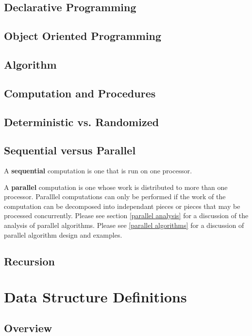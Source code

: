 \documentclass[12pt, letterpaper]{book}
\begin{document}
\section{Declarative Programming}

\section{Object Oriented Programming}

\section{Algorithm}

\section{Computation and Procedures}

\section{Deterministic vs. Randomized}

\section{Sequential versus Parallel}

	A \textbf{sequential} computation is one that is run on one processor.

	A \textbf{parallel} computation is one whose work is distributed to more than one processor. Paralllel computations can only be performed if the work of the computation can be decomposed into independant pieces or pieces that may be processed concurrently. Please see section \ref{parallel analysis} for a discussion of the analysis of parallel algorithms. Please see \ref{parallel algorithms} for a discussion of parallel algorithm design and examples.

\section{Recursion}

\chapter{Data Structure Definitions}

\section{Overview}
\end{document}
